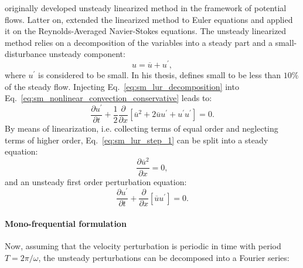 
\citet{Verdon1984} originally developed unsteady linearized 
method in the framework of potential flows. Latter on, \citet{Hall1989}
extended the linearized method to Euler equations and
\citet{Clark2000} applied it on the Reynolds-Averaged Navier-Stokes equations.
The unsteady linearized method relies on a decomposition of the variables
into a steady part and a small-disturbance unsteady component:
\begin{equation}
	u = \overline{u} + u^\prime,
	\label{eq:sm_lur_decomposition}
\end{equation}
where $u^\prime$ is considered to be small. In his thesis,
\citet{Hall1987} defines small to be less than $10\%$ of the
steady flow.
Injecting Eq.~\ref{eq:sm_lur_decomposition} into 
Eq.~\ref{eq:sm_nonlinear_convection_conservative} leads to:
\begin{equation}
	\frac{\partial u^\prime}{\partial t} + 
	\frac{1}{2}\frac{\partial}{\partial x} \left[
	\overline{u}^2 + 2 \overline{u} u^\prime + u^\prime u^\prime \right] = 
	0.
	\label{eq:sm_lur_step_1}
\end{equation}
By means of linearization, i.e. collecting terms
of equal order and neglecting terms of higher order, 
Eq.~\ref{eq:sm_lur_step_1} can be split
into a steady equation:
\begin{equation}
	\frac{\partial \overline{u}^2}{\partial x} = 0,
\end{equation}
and an unsteady first order perturbation equation:
\begin{equation}
	\frac{\partial u^\prime}{\partial t} +
	\frac{\partial}{\partial x} \left[
	\overline{u} u^\prime \right] = 
	0.
\end{equation}

\paragraph{Mono-frequential formulation}
Now, assuming that the velocity perturbation is periodic in 
time with period $T = 2\pi / \omega$, the unsteady perturbations 
can be decomposed into a Fourier series:
